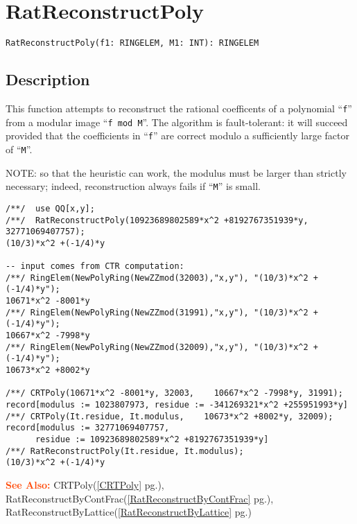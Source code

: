\documentclass[a4paper]{mybook}
\newenvironment{command}{}{} %
\newcommand\SeeAlso{\par\textcolor{OrangeRed}{\textbf{\large See Also: }}}
\begin{document}
\section{RatReconstructPoly}
\label{RatReconstructPoly}
\begin{command} %


\begin{Verbatim}[label=syntax, rulecolor=\color{MidnightBlue},
frame=single]
RatReconstructPoly(f1: RINGELEM, M1: INT): RINGELEM
\end{Verbatim}


\subsection*{Description}

This function attempts to reconstruct the rational coefficents of a
polynomial ``\verb&f&'' from a modular image ``\verb&f mod M&''.  
The algorithm is fault-tolerant: it will succeed provided
that the coefficients in ``\verb&f&'' are correct modulo a sufficiently
large factor of ``\verb&M&''.
\par 
NOTE: so that the heuristic can work, the modulus must be larger than
strictly necessary; indeed, reconstruction always fails if ``\verb&M&'' is small.
\begin{Verbatim}[label=example, rulecolor=\color{PineGreen}, frame=single]
/**/  use QQ[x,y];
/**/  RatReconstructPoly(10923689802589*x^2 +8192767351939*y, 32771069407757);
(10/3)*x^2 +(-1/4)*y

-- input comes from CTR computation:
/**/ RingElem(NewPolyRing(NewZZmod(32003),"x,y"), "(10/3)*x^2 +(-1/4)*y");
10671*x^2 -8001*y
/**/ RingElem(NewPolyRing(NewZZmod(31991),"x,y"), "(10/3)*x^2 +(-1/4)*y");
10667*x^2 -7998*y
/**/ RingElem(NewPolyRing(NewZZmod(32009),"x,y"), "(10/3)*x^2 +(-1/4)*y");
10673*x^2 +8002*y

/**/ CRTPoly(10671*x^2 -8001*y, 32003,    10667*x^2 -7998*y, 31991);
record[modulus := 1023807973, residue := -341269321*x^2 +255951993*y]
/**/ CRTPoly(It.residue, It.modulus,    10673*x^2 +8002*y, 32009);
record[modulus := 32771069407757,
      residue := 10923689802589*x^2 +8192767351939*y]
/**/ RatReconstructPoly(It.residue, It.modulus);
(10/3)*x^2 +(-1/4)*y
\end{Verbatim}


\SeeAlso %
  CRTPoly(\ref{CRTPoly} pg.\pageref{CRTPoly}), 
    RatReconstructByContFrac(\ref{RatReconstructByContFrac} pg.\pageref{RatReconstructByContFrac}), 
    RatReconstructByLattice(\ref{RatReconstructByLattice} pg.\pageref{RatReconstructByLattice})
\end{command} %
\end{document}

